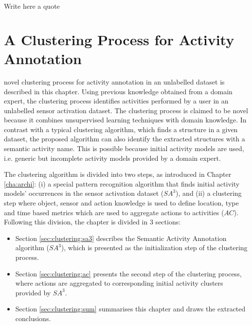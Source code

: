 

\begin{savequote}[50mm]
Write here a quote
\end{savequote}


\chapter{A Clustering Process for Activity Annotation}
\label{cha:clustering}

\ifpdf
    \graphicspath{{4_clustering_process/figures/PDF/}{4_clustering_process/figures/PNG/}{4_clustering_process/figures/}}
\else
    \graphicspath{{4_clustering_process/figures/EPS/}{4_clustering_process/figures/}}
\fi

 novel clustering process for activity annotation in an unlabelled dataset is described in this chapter. Using previous knowledge obtained from a domain expert, the clustering process identifies activities performed by a user in an unlabelled sensor activation dataset. The clustering process is claimed to be novel because it combines unsupervised learning techniques with domain knowledge. In contrast with a typical clustering algorithm, which finds a structure in a given dataset, the proposed algorithm can also identify the extracted structures with a semantic activity name. This is possible because initial activity models are used, i.e. generic but incomplete activity models provided by a domain expert. 

The clustering algorithm is divided into two steps, as introduced in Chapter \ref{cha:archi}: (i) a special pattern recognition algorithm that finds initial activity models' occurrences in the sensor activation dataset ($SA^3$), and (ii) a clustering step where object, sensor and action knowledge is used to define location, type and time based metrics which are used to aggregate actions to activities ($AC$). Following this division, the chapter is divided in 3 sections:

\begin{itemize}
 \item Section \ref{sec:clustering:sa3} describes the Semantic Activity Annotation algorithm ($SA^3$), which is presented as the initialization step of the clustering process.
 \item Section \ref{sec:clustering:ac} presents the second step of the clustering process, where actions are aggregated to corresponding initial activity clusters provided by $SA^3$.
 \item Section \ref{sec:clustering:sum} summarises this chapter and draws the extracted conclusions.
\end{itemize}
